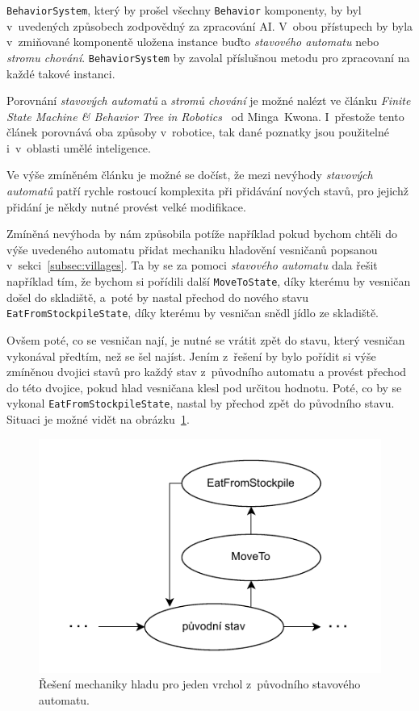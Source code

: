 \texttt{BehaviorSystem}, který by prošel všechny \texttt{Behavior} komponenty, by byl v~uvedených způsobech zodpovědný za zpracování AI. V~obou přístupech by byla v~zmiňované komponentě uložena instance buďto \textit{stavového automatu} nebo \textit{stromu chování}. \texttt{BehaviorSystem} by zavolal příslušnou metodu pro zpracovaní na každé takové instanci.


Porovnání \textit{stavových automatů} a \textit{stromů chování} je možné nalézt ve článku \textit{Finite State Machine \& Behavior Tree in Robotics}~\cite{FMTAndBTInRobotics} od Minga~Kwona. I~přestože tento článek porovnává oba způsoby v~robotice, tak dané poznatky jsou použitelné i~v~oblasti umělé inteligence.

Ve výše zmíněném článku je možné se dočíst, že mezi nevýhody \textit{stavových automatů} patří rychle rostoucí komplexita při přidávání nových stavů, pro jejichž přidání je někdy nutné provést velké modifikace.

Zmíněná nevýhoda by nám způsobila potíže například pokud bychom chtěli do výše uvedeného automatu přidat mechaniku hladovění vesničanů popsanou v~sekci~\ref{subsec:villages}. Ta by se za pomoci \textit{stavového automatu} dala řešit například tím, že bychom si pořídili další \texttt{MoveToState}, díky kterému by vesničan došel do skladiště, a~poté by nastal přechod do nového stavu \texttt{EatFromStockpileState}, díky kterému by vesničan snědl jídlo ze skladiště. 

Ovšem poté, co se vesničan nají, je nutné se vrátit zpět do stavu, který vesničan vykonával předtím, než se šel najíst. Jením z~řešení by bylo pořídit si výše zmíněnou dvojici stavů pro každý stav z~původního automatu a provést přechod do této dvojice, pokud hlad vesničana klesl pod určitou hodnotu. Poté, co by se vykonal \texttt{EatFromStockpileState}, nastal by přechod zpět do původního stavu. Situaci je možné vidět na obrázku~\ref{fig:transition}.

\begin{figure}[!htb]
    \centering
    \includegraphics[width=0.6\linewidth]{img/transition.pdf}
    \caption{Řešení mechaniky hladu pro jeden vrchol z~původního stavového automatu.}
    \label{fig:transition}
\end{figure}

